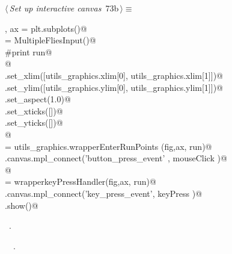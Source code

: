 \documentclass[11.5pt]{report}
\begin{document}
\vspace{-0.8cm}\newchunk 
\begin{flushleft} \small\label{scrap108}\raggedright\small
{} $\langle\,${\itshape Set up interactive canvas}\nobreak\ {\footnotesize {73b}}$\,\rangle\equiv$
\vspace{-1ex}
\begin{list}{}{} \item
\mbox{}\verb@fig, ax =  plt.subplots()@\\
\mbox{}\verb@run = MultipleFliesInput()@\\
\mbox{}\verb@#print run@\\
\mbox{}\verb@    @\\
\mbox{}\verb@ax.set_xlim([utils_graphics.xlim[0], utils_graphics.xlim[1]])@\\
\mbox{}\verb@ax.set_ylim([utils_graphics.ylim[0], utils_graphics.ylim[1]])@\\
\mbox{}\verb@ax.set_aspect(1.0)@\\
\mbox{}\verb@ax.set_xticks([])@\\
\mbox{}\verb@ax.set_yticks([])@\\
\mbox{}\verb@      @\\
\mbox{}\verb@mouseClick   = utils_graphics.wrapperEnterRunPoints (fig,ax, run)@\\
\mbox{}\verb@fig.canvas.mpl_connect('button_press_event' , mouseClick )@\\
\mbox{}\verb@      @\\
\mbox{}\verb@keyPress     = wrapperkeyPressHandler(fig,ax, run)@\\
\mbox{}\verb@fig.canvas.mpl_connect('key_press_event', keyPress   )@\\
\mbox{}\verb@plt.show()@\\
\mbox{}\verb@@{\NWsep}
\end{list}
\vspace{-1.5ex}
\footnotesize
\begin{list}{}{\setlength{\itemsep}{-\parsep}\setlength{\itemindent}{-\leftmargin}}
\item \NWtxtMacroRefIn\ .
\item \NWtxtIdentsUsed\nobreak\  \verb@wrapperkeyPressHandler@\nobreak\ .
\item{}
\end{list}
\vspace{4ex}
\end{flushleft}
\end{document}
